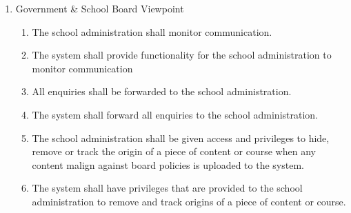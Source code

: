 \documentclass[]{article}
\begin{document}
\begin{enumerate}[{BE}1.]
\begin{enumerate}[{VP1}.1]
		\item Government \& School Board Viewpoint
			\begin{enumerate}
				\item The school administration shall monitor communication.
				\item The system shall provide functionality for the school administration to monitor communication
				\item All enquiries shall be
forwarded to the school administration.
				\item The system shall forward all enquiries to the school administration.
				\item The school
administration shall be given access and privileges to hide, remove or track the
origin of a piece of content or course when any content malign against board
policies is uploaded to the system.
				\item The system shall have privileges that are provided to the school administration to remove and track origins of a piece of content or course.
			\end{enumerate}
	\end{enumerate}


\end{enumerate}
\end{document}
